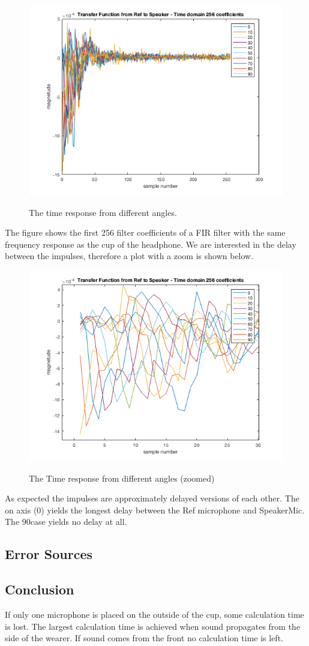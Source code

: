 \begin{figure}[H]
	\includegraphics[width=\textwidth]{../Journal/Experiments/AngleOfIncidence/impulseRef2Speaker.png}
	\label{Fig:AngOfIncTime}
	\caption{The time response from different angles.}
\end{figure}
The figure shows the first 256 filter coefficients of a FIR filter with the same frequency response as the cup of the headphone. We are interested in the delay between the impulses, therefore a plot with a zoom is shown below.
\begin{figure}[H]
	\includegraphics[width=\textwidth]{../Journal/Experiments/AngleOfIncidence/impulsezoomRef2Speaker.png}
	\label{Fig:AngOfIncTimezoom}
	\caption{The Time response from different angles (zoomed)}
\end{figure} 
As expected the impulses are approximately delayed versions of each other. The on axis (0\degrees) yields the longest delay between the Ref microphone and SpeakerMic. The 90\degrees  case yields no delay at all. 

\subsection{Error Sources}

\subsection{Conclusion}
If only one microphone is placed on the outside of the cup, some calculation time is lost. The largest calculation time is achieved when sound propagates from the side of the wearer. If sound comes from the front no calculation time is left. 